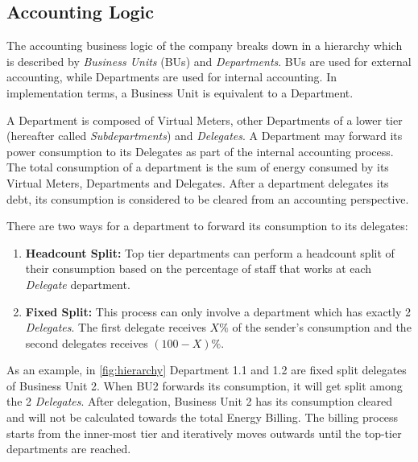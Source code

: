 
\subsection{Accounting Logic} \label{billing}

The accounting business logic of the company breaks down in a hierarchy which is described by \textit{Business Units} (BUs) and \textit{Departments}. BUs are used for external accounting, while Departments are used for internal accounting. In implementation terms, a Business Unit is equivalent to a Department.

A Department is composed of Virtual Meters, other Departments of a lower tier %
 (hereafter called \textit{Subdepartments}) and \textit{Delegates}. A Department may forward its power consumption to its Delegates as part of the internal accounting process. The total consumption of a department is the sum of energy consumed by its Virtual Meters, Departments and Delegates. After a department delegates its debt, its consumption is considered to be cleared from an accounting perspective.


There are two ways for a department to forward its consumption to its delegates:

\begin{enumerate}
    \item \textbf{Headcount Split:} Top tier departments can perform a headcount split of their consumption based on the percentage of staff that works at each \textit{Delegate} department.
    \item \textbf{Fixed Split:} This process can only involve a department which has exactly 2 \textit{Delegates}. The first delegate receives $X\%$ of the sender's consumption and the second delegates receives $(100-X)\%$.
\end{enumerate}

As an example, in \ref{fig:hierarchy} Department 1.1 and 1.2 are fixed split delegates of Business Unit 2. When BU2 forwards its consumption, it will get split among the 2 \textit{Delegates}. After delegation, Business Unit 2 has its consumption cleared and will not be calculated towards the total Energy Billing. The billing process starts from the inner-most tier and iteratively moves outwards until the top-tier departments are reached.


